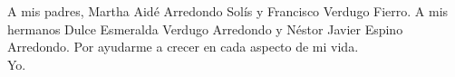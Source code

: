 \begin{dedication}
A mis padres, Martha Aidé Arredondo Solís y Francisco Verdugo Fierro.
A mis hermanos Dulce Esmeralda Verdugo Arredondo y Néstor Javier Espino Arredondo.
Por ayudarme a crecer en cada aspecto de mi vida.\\
Yo.
\end{dedication}
